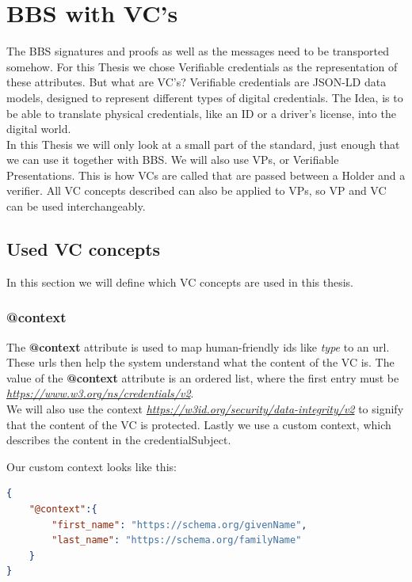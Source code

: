 \documentclass[
	a4paper               %
	,bibliography=totoc   %
	,listof=totoc         %
	,monolingual
	twoside=false,
]{bfhthesis}              %
\begin{document}
\section{BBS with VC's}
The BBS signatures and proofs as well as the messages need to be transported somehow.
For this Thesis we chose Verifiable credentials \cite{verifiable-credentials} as the representation of these attributes.
But what are VC's? \newline
Verifiable credentials are JSON-LD data models, designed to represent different types of digital credentials.
The Idea, is to be able to translate physical credentials, like an ID or a driver's license, into the digital world.\\
In this Thesis we will only look at a small part of the standard, just enough that we can use it together with BBS.
We will also use VPs, or Verifiable Presentations. This is how VCs are called that are passed between a Holder and a verifier.
All VC concepts described can also be applied to VPs, so VP and VC can be used interchangeably.

\subsection{Used VC concepts}
In this section we will define which VC concepts are used in this thesis.

\subsubsection{@context}
The \textbf{@context} attribute is used to map human-friendly ids like \textit{type} to an url.
These urls then help the system understand what the content of the VC is.
The value of the \textbf{@context} attribute is an ordered list, where the first entry must be \textit{\url{https://www.w3.org/ns/credentials/v2}}.\\
We will also use the context \textit{\url{https://w3id.org/security/data-integrity/v2}} to signify that the content of the VC is protected.
Lastly we use a custom context, which describes the content in the credentialSubject.\newpage

Our custom context looks like this:
\begin{lstlisting}[language=json,firstnumber=1,caption={Example custom context},captionpos=b]
{
    "@context":{
        "first_name": "https://schema.org/givenName",
        "last_name": "https://schema.org/familyName"
    }
}
\end{lstlisting}
\end{document}

